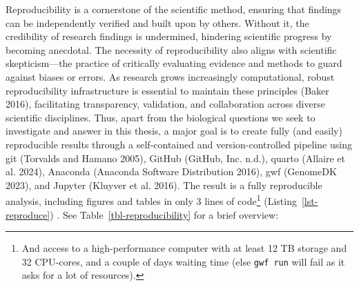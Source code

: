\documentclass[
  11pt,
  a4paper,
]{scrbook}
\begin{document}
Reproducibility is a cornerstone of the scientific method, ensuring that
findings can be independently verified and built upon by others. Without
it, the credibility of research findings is undermined, hindering
scientific progress by becoming anecdotal. The necessity of
reproducibility also aligns with scientific skepticism---the practice of
critically evaluating evidence and methods to guard against biases or
errors. As research grows increasingly computational, robust
reproducibility infrastructure is essential to maintain these principles
(Baker 2016), facilitating transparency, validation, and collaboration
across diverse scientific disciplines. Thus, apart from the biological
questions we seek to investigate and answer in this thesis, a major goal
is to create fully (and easily) reproducible results through a
self-contained and version-controlled pipeline using git (Torvalds and
Hamano 2005), GitHub (GitHub, Inc. n.d.), quarto (Allaire et al. 2024),
Anaconda (Anaconda Software Distribution 2016), gwf (GenomeDK 2023), and
Jupyter (Kluyver et al. 2016). The result is a fully reproducible
analysis, including figures and tables in only 3 lines of
code\footnote{And access to a high-performance computer with at least 12
  TB storage and 32 CPU-cores, and a couple of days waiting time (else
  \texttt{gwf\ run} will fail as it asks for a lot of resources).}
(Listing~\ref{lst-reproduce}) . See Table~\ref{tbl-reproducibility} for
a brief overview:
\end{document}
